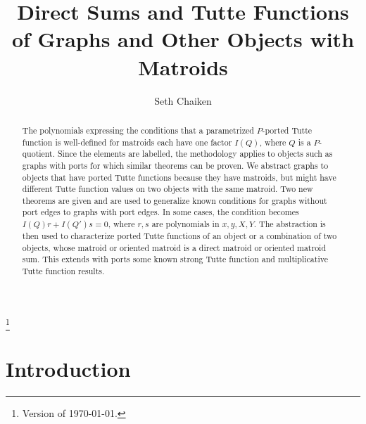 \documentclass[12pt,leqno]{amsart}
\theoremstyle{remark}
\begin{document}
\title[Direct Sums and Other Objects with Matroids]
{Direct Sums and Tutte Functions of Graphs and Other Objects
with Matroids}


\author{Seth Chaiken}
\address{Computer Science Department\\
The University at Albany (SUNY)\\
Albany, NY 12222, U.S.A.}



\begin{abstract}

The polynomials expressing the conditions that
a parametrized $P$-ported Tutte function is well-defined
for matroids
each have one factor $I(Q)$, where $Q$ is a $P$-quotient.  
Since the elements are 
labelled, the methodology applies
to objects such as graphs with ports
for which similar theorems can be proven.  
We abstract graphs to objects that have 
ported Tutte functions
because they have matroids, but might
have different Tutte function values
on two objects with the same matroid.
Two new theorems are given
and are used to generalize known conditions
for graphs without port edges to graphs with port edges.
In some cases, the condition becomes
$I(Q)r+I(Q')s=0$, where $r,s$ are 
polynomials in $x,y,X,Y$.
The abstraction is then used to
characterize ported Tutte functions
of an object or a combination of two
objects, whose matroid or oriented 
matroid is a direct matroid or
oriented matroid sum.  
This extends with ports some 
known strong Tutte 
function and multiplicative 
Tutte function results.
\end{abstract}





\thanks{Version of \today.}

\maketitle
\pagestyle{headings}



\section{Introduction}
\end{document}
